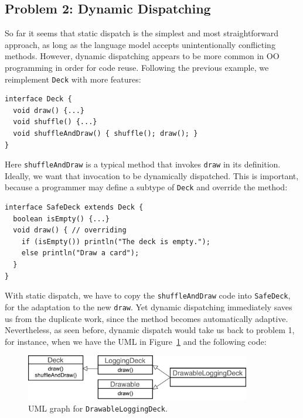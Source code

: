 \subsection{Problem 2: Dynamic Dispatching}
So far it seems that static dispatch is the simplest and most straightforward approach,
as long as the language model accepts unintentionally conflicting methods. However, dynamic
dispatching appears to be more common in OO programming in order for code reuse. Following the previous example,
we reimplement \lstinline|Deck| with more features:

\vspace{3pt}\begin{lstlisting}
interface Deck {
  void draw() {...}
  void shuffle() {...}
  void shuffleAndDraw() { shuffle(); draw(); }
}
\end{lstlisting}\vspace{3pt}
Here \lstinline|shuffleAndDraw| is a typical method that invokes \lstinline|draw| in its definition. Ideally,
we want that invocation to be dynamically dispatched. This is important, because a programmer may define a subtype
of \lstinline|Deck| and override the method:

\vspace{3pt}\begin{lstlisting}
interface SafeDeck extends Deck {
  boolean isEmpty() {...}
  void draw() { // overriding
    if (isEmpty()) println("The deck is empty.");
    else println("Draw a card");
  }
}
\end{lstlisting}\vspace{3pt}
With static dispatch, we have to copy the \lstinline|shuffleAndDraw| code into \lstinline|SafeDeck|,
for the adaptation to the new \lstinline|draw|. Yet dynamic dispatching immediately saves us from the duplicate work,
since the method becomes automatically adaptive. Nevertheless, as seen before, dynamic dispatch would take us back to problem
1, for instance, when we
have the UML in Figure~\ref{fig:drawableloggingdeck} and the following code:

\begin{figure}[t]
	\saveSpaceFig
	\centering
	\includegraphics[height=2cm]{pics/DrawableLoggingDeck.pdf}
	\caption{UML graph for \lstinline|DrawableLoggingDeck|.}\label{fig:drawableloggingdeck}
	\saveSpaceFig
\end{figure}

